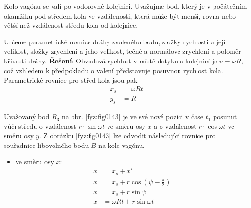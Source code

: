 \begin{mdframed}[style=mdexam]
  \begin{example}\label{fyz:fey_exam003}
    Kolo vagónu se valí po vodorovné kolejnici. Uvažujme bod, který je v počátečním okamžiku pod
    středem kola ve vzdálenosti, která může být menší, rovna nebo větší než vzdálenost středu kola
    od kolejnice.

    {\centering
      \captionsetup{type=figure}
      \label{fyz:fig0141}
    \par}
    \vspace{0.5em}
    Určeme parametrické rovnice dráhy zvoleného bodu, složky rychlosti a její velikost, složky 
    zrychlení a jeho velikost, tečné a normálové zrychlení a poloměr křivosti dráhy. 
    \cite[p.~11]{Slavik}
    \vspace{1em}
    \newline
    \textbf{Řešení}: Obvodová rychlost v místě dotyku s kolejnicí je \(v=\omega R\), což vzhledem k
    předpokladu o valení představuje posuvnou rychlost kola. Parametrické rovnice pro střed kola
    jsou pak
    \begin{subequations}\label{mech:eq_wheel_center}
      \begin{align}
        x_s &= \omega R t \\
        y_s &= R
      \end{align}
    \end{subequations}

    {\centering
      \captionsetup{type=figure}
      \label{fyz:fig0143}
    \par}
    \vspace{0.5em}
    Uvažovaný bod \(B_3\) na obr. \ref{fyz:fig0143} je ve své nové pozici v čase \(t_1\) posunut vůči
    středu o vzdálenost \(r\cdot\sin\omega t\) ve směru osy \(x\) a o vzdálenost \(r\cdot\cos\omega
    t\) ve směru osy \(y\). Z obrázku \ref{fyz:fig0143} lze odvodit následující rovnice pro
    souřadnice libovolného bodu \(B\) na kole vagónu.  
            
      \begin{itemize}
        \item ve směru osy \(x\):
        \begin{align*}
          x &= x_s + x'                        \\
          x &= x_s + r\cos(\psi-\frac{\pi}{2}) \\
          x &= x_s + r\sin\psi                 \\
          x &= \omega R t + r\sin\omega t
        \end{align*}
        \end{itemize}  



\end{example}
\end{mdframed}
